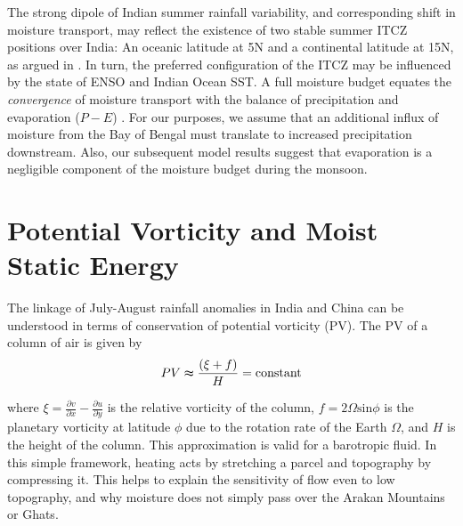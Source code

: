 	The strong dipole of Indian summer rainfall variability, and corresponding shift in moisture transport, may reflect the existence of two stable summer ITCZ positions over India: An oceanic latitude at 5\textdegree N and a continental latitude at 15\textdegree N, as argued in \cite{Gadgil2003}. In turn, the preferred configuration of the ITCZ may be influenced by the state of ENSO and Indian Ocean SST. A full moisture budget equates the \textit{convergence} of moisture transport with the balance of precipitation and evaporation ($P-E$) \citep{Trenberth1991,Chen2014b}. For our purposes, we assume that an additional influx of moisture from the Bay of Bengal must translate to increased precipitation downstream. Also, our subsequent model results suggest that evaporation is a negligible component of the moisture budget during the monsoon.
		
\section{Potential Vorticity and Moist Static Energy}

	The linkage of July-August rainfall anomalies in India and China can be understood in terms of conservation of potential vorticity (PV). The PV of a column of air is given by
	\begin{displaymath}
			PV  \thickapprox \frac{\left(\xi+f\right)}{H}  = \mathrm{ constant}
	\end{displaymath}
	
	where $\xi = \frac{\partial v}{\partial x}-\frac{\partial u}{\partial y}$ is the relative vorticity of the column, $f=2\Omega\mathrm{sin}\phi$ is the planetary vorticity at latitude $\phi$ due to the rotation rate of the Earth $\Omega$, and $H$ is the height of the column. This approximation is valid for a barotropic fluid. In this simple framework, heating acts by stretching a parcel and topography by compressing it. This helps to explain the sensitivity of flow even to low topography, and why moisture does not simply pass over the Arakan Mountains or Ghats.
	
